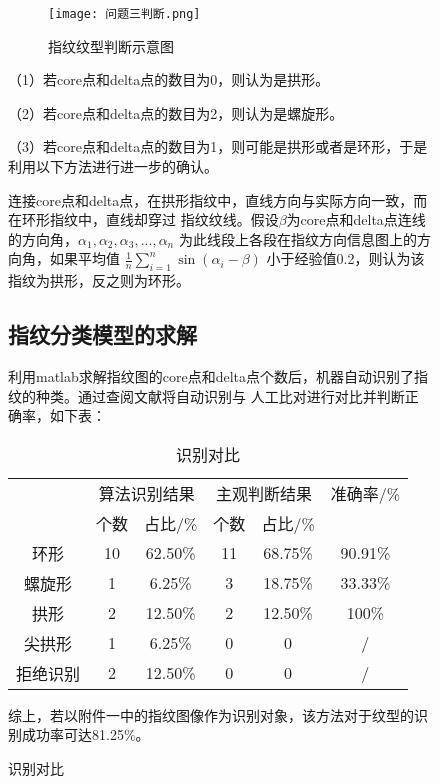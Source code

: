 \documentclass{whutmod}
\begin{document}
\begin{spacing}{1.2}
\begin{figure}[H]
\begin{figure}[H]
	\centering
	\texttt{[image: 问题三判断.png]}
	\caption{ 指纹纹型判断示意图}
	\label{纹型判断}
\end{figure}

（1）若core点和delta点的数目为0，则认为是拱形。

（2）若core点和delta点的数目为2，则认为是螺旋形。

（3）若core点和delta点的数目为1，则可能是拱形或者是环形，于是利用以下方法进行进一步的确认。

连接core点和delta点，在拱形指纹中，直线方向与实际方向一致，而在环形指纹中，直线却穿过
指纹纹线。假设$\beta$为core点和delta点连线的方向角，$\alpha_1,\alpha_2,\alpha_3,...,\alpha_n$
为此线段上各段在指纹方向信息图上的方向角，如果平均值
         $ \frac{1}{n}\sum_{i=1}^n\sin(\alpha_i-\beta)$
小于经验值0.2，则认为该指纹为拱形，反之则为环形。

\subsection{指纹分类模型的求解}

利用matlab求解指纹图的core点和delta点个数后，机器自动识别了指纹的种类。通过查阅文献将自动识别与
人工比对进行对比并判断正确率，如下表：

\begin{table}[H]
	\centering
	\setlength{\abovecaptionskip}{5pt}
	\caption{识别对比}
	  \begin{tabular}{cccccc}
		\toprule[1.5pt]
		  & \multicolumn{2}{c}{算法识别结果} & \multicolumn{2}{c}{主观判断结果} & 准确率/\% \\
		  & 个数  & 占比/\% & 个数  & 占比/\% &  \\ \hline
	  环形  & 10  & 62.50\% & 11  & 68.75\% & 90.91\% \\
	  螺旋形 & 1   & 6.25\% & 3   & 18.75\% & 33.33\% \\
	  拱形  & 2   & 12.50\% & 2   & 12.50\% & 100\% \\
	  尖拱形 & 1   & 6.25\% & 0   & 0   & / \\
	  拒绝识别 & 2   & 12.50\% & 0   & 0   & / \\
	  \bottomrule[1.5pt]
	  \end{tabular}%
	\label{tab:addlabel}%
\end{table}%
  
综上，若以附件一中的指纹图像作为识别对象，该方法对于纹型的识别成功率可达81.25\%。




\end{figure}
\end{spacing}
\end{document}
